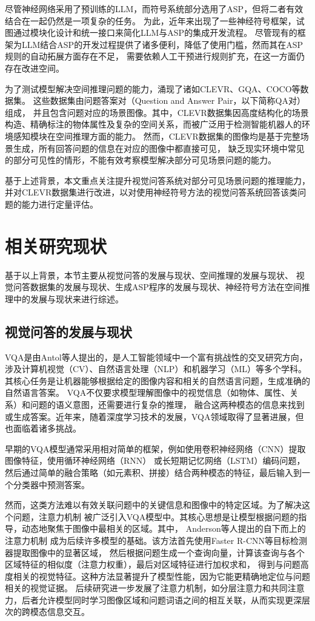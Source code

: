 尽管神经网络采用了预训练的LLM，而符号系统部分选用了ASP，但将二者有效结合在一起仍然是一项复杂的任务。
为此，近年来出现了一些神经符号框架，试图通过模块化设计和统一接口来简化LLM与ASP的集成开发流程\cite{wang2024dspybasedneuralsymbolicpipelineenhance}。
尽管现有的框架为LLM结合ASP的开发过程提供了诸多便利，降低了使用门槛，然而其在ASP规则的自动拓展方面存在不足，
需要依赖人工干预进行规则扩充，在这一方面仍存在改进空间。

为了测试模型解决空间推理问题的能力，涌现了诸如CLEVR、GQA、COCO等数据集。
这些数据集由问题答案对（Question and Answer Pair，以下简称QA对）组成，
并且包含问题对应的场景图像。其中，CLEVR数据集因高度结构化的场景构造、精确标注的物体属性及复杂的空间关系，而被广泛用于检测智能机器人的环境感知模块在空间推理方面的能力。
然而，CLEVR数据集的图像均是基于完整场景生成，所有回答问题的信息在对应的图像中都直接可见，
缺乏现实环境中常见的部分可见性的情形，不能有效考察模型解决部分可见场景问题的能力\cite{sam-abraham-etal-2024-clevr}。

基于上述背景，本文重点关注提升视觉问答系统对部分可见场景问题的推理能力，
并对CLEVR数据集进行改进，以对使用神经符号方法的视觉问答系统回答该类问题的能力进行定量评估。
\section{相关研究现状}
基于以上背景，本节主要从视觉问答的发展与现状、空间推理的发展与现状、
视觉问答数据集的发展与现状、生成ASP程序的发展与现状、神经符号方法在空间推理中的发展与现状来进行综述。

\subsection{视觉问答的发展与现状}
VQA是由Antol等人\cite{Antol2015VQA}提出的，是人工智能领域中一个富有挑战性的交叉研究方向，
涉及计算机视觉（CV）、自然语言处理（NLP）和机器学习（ML）等多个学科。
其核心任务是让机器能够根据给定的图像内容和相关的自然语言问题，生成准确的自然语言答案。
VQA不仅要求模型理解图像中的视觉信息（如物体、属性、关系）和问题的语义意图，还需要进行复杂的推理，
融合这两种模态的信息来找到或生成答案。近年来，随着深度学习技术的发展，VQA领域取得了显著进展，但也面临着诸多挑战。

早期的VQA模型通常采用相对简单的框架，例如使用卷积神经网络（CNN）提取图像特征，使用循环神经网络（RNN）
或长短期记忆网络（LSTM）编码问题，然后通过简单的融合策略（如元素积、拼接）结合两种模态的特征，最后输入到一个分类器中预测答案。

然而，这类方法难以有效关联问题中的关键信息和图像中的特定区域。为了解决这个问题，注意力机制
被广泛引入VQA模型中。其核心思想是让模型根据问题的指导，动态地聚焦于图像中最相关的区域。其中， Anderson等人提出的自下而上的注意力机制\cite{anderson2018bottom}
成为后续许多模型的基础。该方法首先使用Faster R-CNN等目标检测器提取图像中的显著区域，
然后根据问题生成一个查询向量，计算该查询与各个区域特征的相似度（注意力权重），最后对区域特征进行加权求和，
得到与问题高度相关的视觉特征。这种方法显著提升了模型性能，因为它能更精确地定位与问题相关的视觉证据。
后续研究进一步发展了注意力机制，如分层注意力\cite{lu2016hierarchical}和共同注意力，后者允许模型同时学习图像区域和问题词语之间的相互关联，从而实现更深层次的跨模态信息交互。

